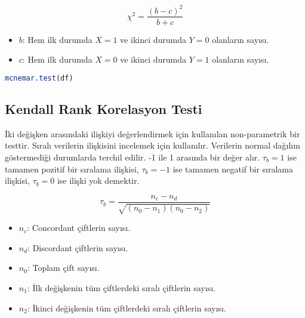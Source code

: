 \[ \chi^2 = \frac{(b - c)^2}{b + c} \]

\begin{itemize}
	\item $b$: Hem ilk durumda $X = 1$ ve ikinci durumda $Y = 0$ olanların sayısı.
	\item $c$: Hem ilk durumda $X = 0$ ve ikinci durumda $Y = 1$ olanların sayısı.
\end{itemize}

\begin{lstlisting}[language=R]
mcnemar.test(df)
\end{lstlisting}

\newpage

\subsection{Kendall Rank Korelasyon Testi}
İki değişken arasındaki ilişkiyi değerlendirmek için kullanılan non-parametrik bir testtir. Sıralı verilerin ilişkisini incelemek için kullanılır. Verilerin normal dağılım göstermediği durumlarda terchil edilir. -1 ile 1 arasında bir değer alır. $\tau_b = 1$ ise tamamen pozitif bir sıralama ilişkisi, $\tau_b = -1$ ise tamamen negatif bir sıralama ilişkisi, $\tau_b = 0$ ise ilişki yok demektir.

\[ \tau_b = \frac{n_c - n_d}{\sqrt{(n_0 - n_1)(n_0 - n_2)}} \]

\begin{itemize}
	\item $n_c$: Concordant çiftlerin sayısı.
	\item $n_d$: Discordant çiftlerin sayısı.
	\item $n_0$: Toplam çift sayısı.
	\item $n_1$: İlk değişkenin tüm çiftlerdeki sıralı çiftlerin sayısı.
	\item $n_2$: İkinci değişkenin tüm çiftlerdeki sıralı çiftlerin sayısı.
\end{itemize}

\newpage